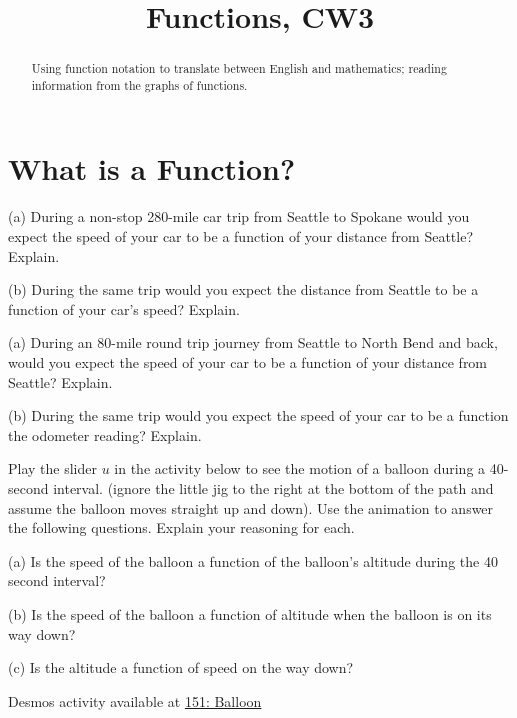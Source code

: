 \documentclass{ximera}
\title{Functions, CW3}
\begin{document}
\begin{abstract}
Using function notation to translate between English and mathematics; reading information from the graphs of functions.
\end{abstract}
\maketitle

\section{What is a Function?}


\begin{question}  \label{Qdghf4rr3gg4}
(a) During a non-stop 280-mile car trip from Seattle to Spokane would you expect the speed of your car to be a function of your distance from Seattle? Explain.

(b) During the same trip would you expect the distance from Seattle to be a function of your car's speed? Explain.
\end{question}

\begin{question}  \label{Qer435r343554}
(a) During an 80-mile round trip journey from Seattle to North Bend and back, would you expect the speed of your car to be a function of your distance from Seattle? Explain.

(b) During the same trip would you expect the speed of your car to be a function the odometer reading? Explain.
\end{question}


\begin{question}  \label{Q:4sdfdslk8}

Play the slider $u$ in the activity below to see the motion of a balloon during a 40-second interval. (ignore the little jig to the right at the bottom of the path and assume the balloon moves straight up and down). Use the animation to answer the following questions. Explain your reasoning for each.

(a) Is the speed of the balloon a function of the balloon's altitude during the 40 second interval?

(b) Is the speed of the balloon a function of altitude when the balloon is on its way down?

(c) Is the altitude a function of speed on the way down?

\begin{onlineOnly}
    \begin{center}
\end{center}
\end{onlineOnly}

Desmos activity available at \href{https://www.desmos.com/calculator/amv52b9ljt}{151: Balloon}

\end{question}
\end{document}
